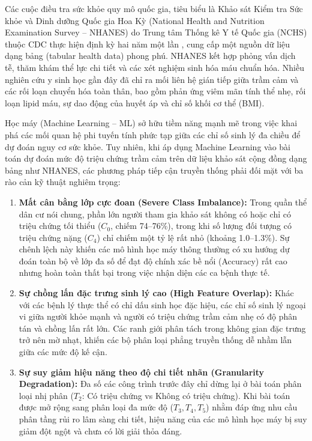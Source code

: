 Các cuộc điều tra sức khỏe quy mô quốc gia, tiêu biểu là Khảo sát Kiểm tra Sức khỏe và Dinh dưỡng Quốc gia Hoa Kỳ (National Health and Nutrition Examination Survey -- NHANES) do Trung tâm Thống kê Y tế Quốc gia (NCHS) thuộc CDC thực hiện định kỳ hai năm một lần \cite{cdc2014nhanes, cdc2016nhanes}, cung cấp một nguồn dữ liệu dạng bảng (tabular health data) phong phú. NHANES kết hợp phỏng vấn dịch tễ, thăm khám thể lực chi tiết và các xét nghiệm sinh hóa máu chuẩn hóa. Nhiều nghiên cứu y sinh học gần đây đã chỉ ra mối liên hệ gián tiếp giữa trầm cảm và các rối loạn chuyển hóa toàn thân, bao gồm phản ứng viêm mãn tính thể nhẹ, rối loạn lipid máu, sự dao động của huyết áp và chỉ số khối cơ thể (BMI).

Học máy (Machine Learning -- ML) sở hữu tiềm năng mạnh mẽ trong việc khai phá các mối quan hệ phi tuyến tính phức tạp giữa các chỉ số sinh lý đa chiều để dự đoán nguy cơ sức khỏe. Tuy nhiên, khi áp dụng Machine Learning vào bài toán dự đoán mức độ triệu chứng trầm cảm trên dữ liệu khảo sát cộng đồng dạng bảng như NHANES, các phương pháp tiếp cận truyền thống phải đối mặt với ba rào cản kỹ thuật nghiêm trọng:
\begin{enumerate}
    \item \textbf{Mất cân bằng lớp cực đoan (Severe Class Imbalance):} Trong quần thể dân cư nói chung, phần lớn người tham gia khảo sát không có hoặc chỉ có triệu chứng tối thiểu ($C_0$, chiếm 74--76\%), trong khi số lượng đối tượng có triệu chứng nặng ($C_4$) chỉ chiếm một tỷ lệ rất nhỏ (khoảng 1.0--1.3\%). Sự chênh lệch này khiến các mô hình học máy thông thường có xu hướng dự đoán toàn bộ về lớp đa số để đạt độ chính xác bề nổi (Accuracy) rất cao nhưng hoàn toàn thất bại trong việc nhận diện các ca bệnh thực tế.
    \item \textbf{Sự chồng lấn đặc trưng sinh lý cao (High Feature Overlap):} Khác với các bệnh lý thực thể có chỉ dấu sinh học đặc hiệu, các chỉ số sinh lý ngoại vi giữa người khỏe mạnh và người có triệu chứng trầm cảm nhẹ có độ phân tán và chồng lấn rất lớn. Các ranh giới phân tách trong không gian đặc trưng trở nên mờ nhạt, khiến các bộ phân loại phẳng truyền thống dễ nhầm lẫn giữa các mức độ kế cận.
    \item \textbf{Sự suy giảm hiệu năng theo độ chi tiết nhãn (Granularity Degradation):} Đa số các công trình trước đây chỉ dừng lại ở bài toán phân loại nhị phân ($T_2$: Có triệu chứng vs Không có triệu chứng). Khi bài toán được mở rộng sang phân loại đa mức độ ($T_3, T_4, T_5$) nhằm đáp ứng nhu cầu phân tầng rủi ro lâm sàng chi tiết, hiệu năng của các mô hình học máy bị suy giảm đột ngột và chưa có lời giải thỏa đáng.
\end{enumerate}


